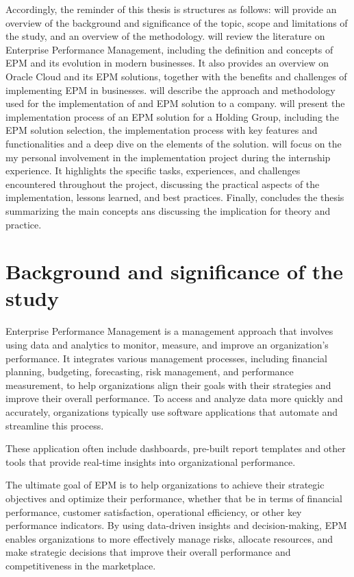 \documentclass[12pt,a4paper,openright,twoside]{book}
\begin{document}
Accordingly, the reminder of this thesis is structures as follows:
%
 will provide an overview of the background and significance of the topic, scope and limitations of the study, and an overview of the methodology.
%
 will review the literature on Enterprise Performance Management, including the definition and concepts of EPM and its evolution in modern businesses. 
%
It also provides an overview on Oracle Cloud and its EPM solutions, together with the benefits and challenges of implementing EPM in businesses. 
%
 will describe the approach and methodology used for the implementation of and EPM solution to a company.
%
 will present the implementation process of an EPM solution for a Holding Group, including the EPM solution selection, the implementation process with key features and functionalities and a deep dive on the elements of the solution.
%
 will focus on the my personal involvement in the implementation project during the internship experience. 
%
It highlights the specific tasks, experiences, and challenges encountered throughout the project, discussing the practical aspects of the implementation, lessons learned, and best practices.
%
Finally,  concludes the thesis summarizing the main concepts ans discussing the implication for theory and practice.

\section{Background and significance of the study}

Enterprise Performance Management is a management approach that involves using data and analytics to monitor, measure, and improve an organization's performance. 
%
It integrates various management processes, including financial planning, budgeting, forecasting, risk management, and performance measurement, to help organizations align their goals with their strategies and improve their overall performance.
%
To access and analyze data more quickly and accurately, organizations typically use software applications that automate and streamline this process.

These application often include dashboards, pre-built report templates and other tools that provide real-time insights into organizational performance.

The ultimate goal of EPM is to help organizations to achieve their strategic objectives and optimize their performance, whether that be in terms of financial performance, customer satisfaction, operational efficiency, or other key performance indicators. 
%
By using data-driven insights and decision-making, EPM enables organizations to more effectively manage risks, allocate resources, and make strategic decisions that improve their overall performance and competitiveness in the marketplace.
\end{document}
